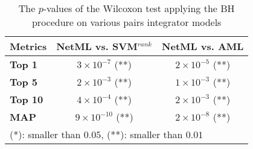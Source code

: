 \begin{table}[!t]
\centering
\caption{The $p$-values of the Wilcoxon test applying the BH procedure on various pairs integrator models}
\begin{tabular}{|l|c|c|}
\hline
\textbf{Metrics} & \textbf{NetML vs. SVM$^{rank}$} & \textbf{NetML vs. AML}  \\ 
\hline \hline
\textbf{Top 1} & $ 3 \times 10^{-7}$ (**) & $ 2 \times 10^{-5}$ (**) \\
\textbf{Top 5} & $ 2 \times 10^{-3}$ (**) & $ 1 \times 10^{-3}$ (**) \\
\textbf{Top 10} & $ 4 \times 10^{-4}$ (**) & $ 2 \times 10^{-3}$ (**) \\
\textbf{MAP} & $ 9 \times 10^{-10}$ (**) & $ 2 \times 10^{-8}$ (**) \\
\hline
\multicolumn{3}{l}{(*): smaller than $0.05$, (**): smaller than $0.01$}
\end{tabular}
\label{tab:wilcoxon_integrator}
\end{table}

